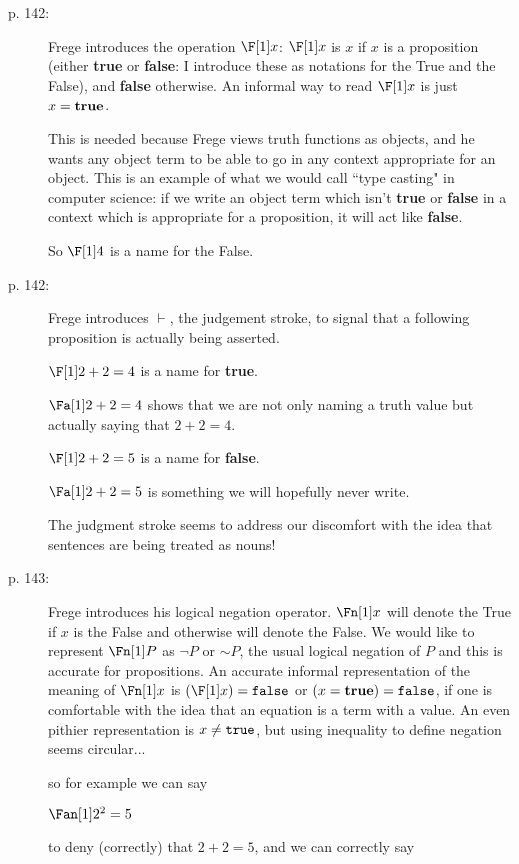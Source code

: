 \documentclass[12pt]{article}
\begin{document}
\begin{description}

\item[p. 142:]  Frege introduces the operation $\F[1]x$:  $\F[1] x$ is $x$ if $x$ is a proposition (either {\bf true} or {\bf false}:  I introduce these as notations for the True and the False), and {\bf false} otherwise.  An informal way to read $\F[1] x$ is just $x={\bf true}$.

This is needed because Frege views truth functions as objects, and he wants any object term to be able to go in any context appropriate for an object.  This is an example of what we would call ``type casting" in computer science:  if we write an object term which isn't {\bf true} or {\bf false} in a context which is appropriate for a proposition, it will act like {\bf false}.

So $\F[1] 4$ is a name for the False.

\item[p. 142:]  Frege introduces $\vdash$, the judgement stroke, to signal that a following proposition is actually being asserted.

$\F[1] 2+2=4$ is a name for {\bf true}.

$\Fa[1]2+2=4$ shows that we are not only naming a truth value but actually saying that $2+2=4$.

$\F[1]2+2=5$ is a name for {\bf false}.

$\Fa[1]2+2=5$ is something we will hopefully never write.

The judgment stroke seems to address our discomfort with the idea that sentences are being treated as nouns!

\item[p. 143:]  Frege introduces his logical negation operator.  $\Fn[1] x$ will denote the True if $x$ is the False and otherwise will denote the False.  We would like to represent
$\Fn[1] P$ as $\neg P$ or $\sim P$, the usual logical negation of $P$ and this is accurate for propositions.  An accurate informal representation of the meaning of 
$\Fn[1] x$ is $(\F[1] x) = {\tt false}$ or $(x = {\bf true}) = {\tt false}$, if one is comfortable with the idea that an equation is a term with a value.  An even pithier representation is
$x \neq {\tt true}$, but using inequality to define negation seems circular...

so for example we can say

$\Fan[1] 2^2=5$

to deny (correctly) that $2+2=5$, and we can correctly say


\end{description}
\end{document}
